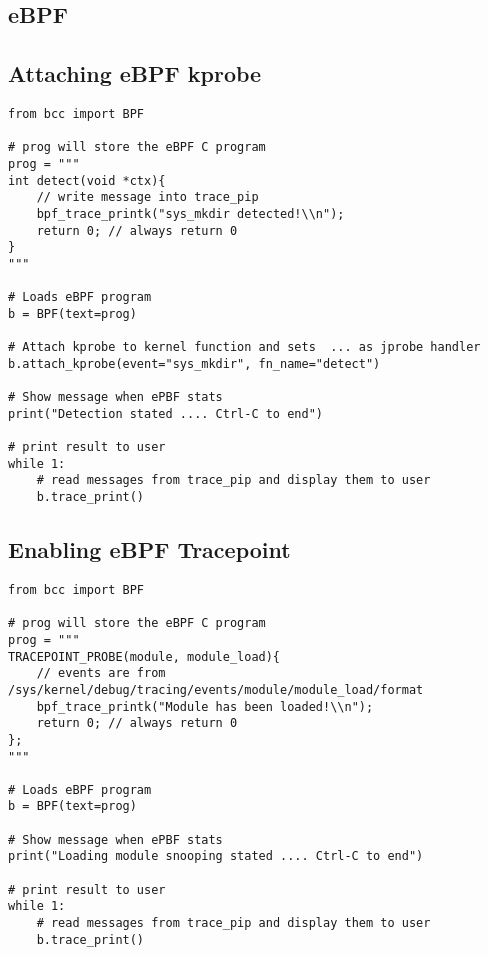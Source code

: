 \begin{appendices}

\section{eBPF}
\subsection{Attaching eBPF kprobe}
\label{Attaching eBPF kprobe}

\begin{lstlisting}[style=PythonStyle]
from bcc import BPF

# prog will store the eBPF C program
prog = """
int detect(void *ctx){
	// write message into trace_pip
	bpf_trace_printk("sys_mkdir detected!\\n");
	return 0; // always return 0
}
"""

# Loads eBPF program
b = BPF(text=prog)

# Attach kprobe to kernel function and sets  ... as jprobe handler
b.attach_kprobe(event="sys_mkdir", fn_name="detect")

# Show message when ePBF stats
print("Detection stated .... Ctrl-C to end")

# print result to user
while 1:
	# read messages from trace_pip and display them to user
	b.trace_print()
\end{lstlisting}



\subsection{Enabling eBPF Tracepoint}
\label{Enabling eBPF Tracepoint}
\begin{lstlisting}[style=PythonStyle]
from bcc import BPF

# prog will store the eBPF C program
prog = """
TRACEPOINT_PROBE(module, module_load){
	// events are from /sys/kernel/debug/tracing/events/module/module_load/format 
	bpf_trace_printk("Module has been loaded!\\n");
	return 0; // always return 0
};
"""

# Loads eBPF program
b = BPF(text=prog)

# Show message when ePBF stats
print("Loading module snooping stated .... Ctrl-C to end")

# print result to user
while 1:
	# read messages from trace_pip and display them to user
	b.trace_print()
\end{lstlisting}



\end{appendices}
